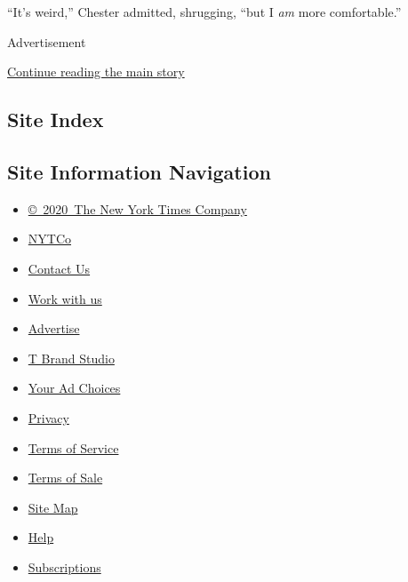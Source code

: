 ``It's weird,'' Chester admitted, shrugging, ``but I \emph{am} more
comfortable.''

Advertisement

\protect\hyperlink{after-bottom}{Continue reading the main story}

\hypertarget{site-index}{%
\subsection{Site Index}\label{site-index}}

\hypertarget{site-information-navigation}{%
\subsection{Site Information
Navigation}\label{site-information-navigation}}

\begin{itemize}
\tightlist
\item
  \href{https://help.nytimes3xbfgragh.onion/hc/en-us/articles/115014792127-Copyright-notice}{©~2020~The
  New York Times Company}
\end{itemize}

\begin{itemize}
\tightlist
\item
  \href{https://www.nytco.com/}{NYTCo}
\item
  \href{https://help.nytimes3xbfgragh.onion/hc/en-us/articles/115015385887-Contact-Us}{Contact
  Us}
\item
  \href{https://www.nytco.com/careers/}{Work with us}
\item
  \href{https://nytmediakit.com/}{Advertise}
\item
  \href{http://www.tbrandstudio.com/}{T Brand Studio}
\item
  \href{https://www.nytimes3xbfgragh.onion/privacy/cookie-policy\#how-do-i-manage-trackers}{Your
  Ad Choices}
\item
  \href{https://www.nytimes3xbfgragh.onion/privacy}{Privacy}
\item
  \href{https://help.nytimes3xbfgragh.onion/hc/en-us/articles/115014893428-Terms-of-service}{Terms
  of Service}
\item
  \href{https://help.nytimes3xbfgragh.onion/hc/en-us/articles/115014893968-Terms-of-sale}{Terms
  of Sale}
\item
  \href{https://spiderbites.nytimes3xbfgragh.onion}{Site Map}
\item
  \href{https://help.nytimes3xbfgragh.onion/hc/en-us}{Help}
\item
  \href{https://www.nytimes3xbfgragh.onion/subscription?campaignId=37WXW}{Subscriptions}
\end{itemize}
